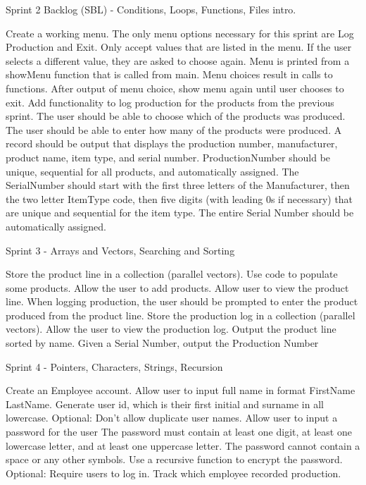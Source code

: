 Sprint 2 Backlog (S\+BL) -\/ Conditions, Loops, Functions, Files intro. \begin{DoxyVerb}Create a working menu. 
    The only menu options necessary for this sprint are Log Production and Exit. 
    Only accept values that are listed in the menu.
    If the user selects a different value, they are asked to choose again.
    Menu is printed from a showMenu function that is called from main. 
    Menu choices result in calls to functions. 
    After output of menu choice, show menu again until user chooses to exit.
Add functionality to log production for the products from the previous sprint.
    The user should be able to choose which of the products was produced.
    The user should be able to enter how many of the products were produced.
    A record should be output that displays the production number, manufacturer, product name, item type, and serial number. 
        ProductionNumber should be unique, sequential for all products, and automatically assigned.
        The SerialNumber should start with the first three letters of the Manufacturer, then the two letter ItemType code, then five digits (with leading 0s if necessary) that are unique and sequential for the item type. The entire Serial Number should be automatically assigned. 
\end{DoxyVerb}


Sprint 3 -\/ Arrays and Vectors, Searching and Sorting \begin{DoxyVerb}Store the product line in a collection (parallel vectors). 
    Use code to populate some products.
    Allow the user to add products.
    Allow user to view the product line. 
When logging production, the user should be prompted to enter the product produced from the product line.
Store the production log in a collection (parallel vectors). 
    Allow the user to view the production log. 
Output the product line sorted by name.
Given a Serial Number, output the Production Number  
\end{DoxyVerb}


Sprint 4 -\/ Pointers, Characters, Strings, Recursion \begin{DoxyVerb}Create an Employee account. 
    Allow user to input full name in format FirstName LastName.  
        Generate user id, which is their first initial and surname in all lowercase.
        Optional: Don't allow duplicate user names. 
    Allow user to input a password for the user
        The password must contain at least one digit, at least one lowercase letter, and at least one uppercase letter. The password cannot contain a space or any other symbols. 
        Use a recursive function to encrypt the password. 
Optional: Require users to log in. Track which employee recorded production. 
\end{DoxyVerb}


